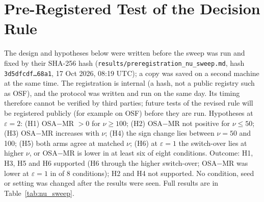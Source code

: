 \documentclass[journal]{IEEEtran}
\begin{document}
\section{Pre-Registered Test of the Decision Rule}
\label{sec:prereg}

The design and hypotheses below were written before the sweep was run and fixed by their SHA-256 hash (\texttt{results/preregistration\_nu\_sweep.md}, hash \texttt{3d5dfcdf\ldots68a1}, 17 Oct 2026, 08:19 UTC); a copy was saved on a second machine at the same time. The registration is internal (a hash, not a public registry such as OSF), and the protocol was written and run on the same day. Its timing therefore cannot be verified by third parties; future tests of the revised rule will be registered publicly (for example on OSF) before they are run. Hypotheses at $\varepsilon=2$: (H1) OSA$-$MR $>0$ for $\nu\ge100$; (H2) OSA$-$MR not positive for $\nu\le50$; (H3) OSA$-$MR increases with $\nu$; (H4) the sign change lies between $\nu=50$ and 100; (H5) both arms agree at matched $\nu$; (H6) at $\varepsilon=1$ the switch-over lies at higher $\nu$, or OSA$-$MR is lower in at least six of eight conditions. Outcome: H1, H3, H5 and H6 supported (H6 through the higher switch-over; OSA$-$MR was lower at $\varepsilon=1$ in \nsLowerCount{} of 8 conditions); H2 and H4 not supported. No condition, seed or setting was changed after the results were seen. Full results are in Table~\ref{tab:nu_sweep}.





\end{document}
